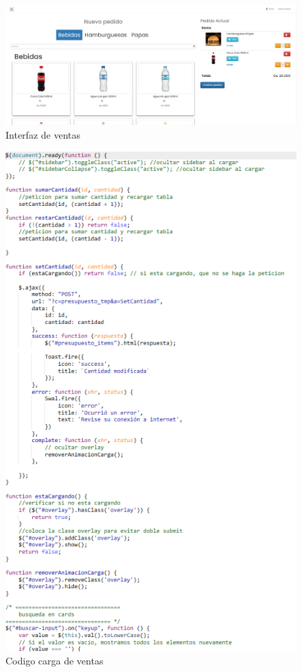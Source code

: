   \begin{figure}[H]
    \begin{center}
      \includegraphics[scale=0.25]{./sistema/nueva_venta.png}
      \caption{Interfaz de ventas}
      \label{fig:product}
    \end{center}
  \end{figure}
  \begin{figure}[H]
    \begin{center}
      \includegraphics[scale=0.65]{./sistema/codigo_venta.png}
      \caption{Codigo carga de ventas}
      \label{fig:product}
    \end{center}
  \end{figure}

